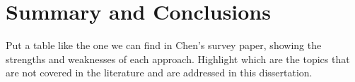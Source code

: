 \section{Summary and Conclusions}
\label{sec:soa:knowledgedriven}

Put a table like the one we can find in Chen's survey paper, showing the strengths and weaknesses of each approach. Highlight which are the topics that are not covered in the literature and are addressed in this dissertation.